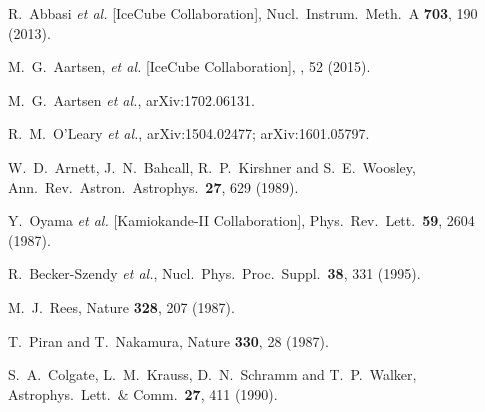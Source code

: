 \documentclass[aps,prd,nofootinbib,twocolumn,floatfix,letterpaper,superscriptaddress,showpacs]{revtex4}
\begin{document}
\begin{thebibliography}{99}
  R.~Abbasi {\it et al.} [IceCube Collaboration],
  Nucl.\ Instrum.\ Meth.\ A {\bf 703}, 190 (2013).


  M.~G.~Aartsen, {\it et al.} [IceCube Collaboration],
  , 52 (2015).

  M.~G.~Aartsen {\it et al.},
  arXiv:1702.06131.

  R.~M.~O'Leary {\it et al.},
  arXiv:1504.02477;
  arXiv:1601.05797.

  W.~D.~Arnett, J.~N.~Bahcall, R.~P.~Kirshner and S.~E.~Woosley,
  Ann.\ Rev.\ Astron.\ Astrophys.\  {\bf 27}, 629 (1989).

  Y.~Oyama {\it et al.} [Kamiokande-II Collaboration],
  Phys.\ Rev.\ Lett.\  {\bf 59}, 2604 (1987).

  R.~Becker-Szendy {\it et al.},
  Nucl.\ Phys.\ Proc.\ Suppl.\  {\bf 38}, 331 (1995).

  M.~J.\ Rees,
  Nature {\bf 328}, 207 (1987).

  T.~Piran and T.~Nakamura,
  Nature {\bf 330}, 28 (1987).

  S.~A.~Colgate, L.~M.~Krauss, D.~N.~Schramm and T.~P.~Walker,
  Astrophys.\ Lett.\ \& Comm.\, {\bf 27}, 411 (1990).




\end{thebibliography}
\end{document}
